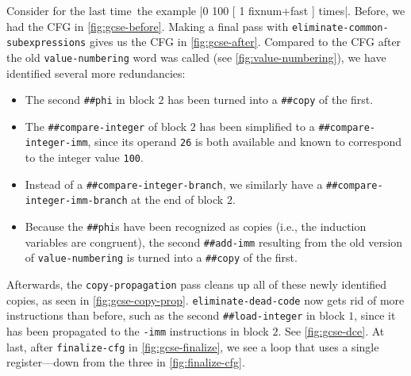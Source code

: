 
Consider for the last time~the example
%
\factor|0 100 [ 1 fixnum+fast ] times|.
%
Before, we had the \gls{CFG} in \vref{fig:gcse-before}.  Making a final pass
with \Verb|eliminate-common-subexpressions| gives us the \gls{CFG} in
\vref{fig:gcse-after}.  Compared to the \gls{CFG} after the old
\Verb|value-numbering| word was called (see \vref{fig:value-numbering}), we
have identified several more redundancies:
\begin{itemize}
  \item The second \Verb|##phi| in block $2$ has been turned into a
  \Verb|##copy| of the first.
%
  \item The \Verb|##compare-integer| of block $2$ has been simplified to
  a \Verb|##compare-integer-imm|, since its operand \Verb|26| is both
  available and known to correspond to the integer value \Verb|100|.
%
  \item Instead of a \Verb|##compare-integer-branch|, we similarly have a
  \Verb|##compare-integer-imm-branch| at the end of block $2$.
%
  \item Because the \Verb|##phi|s have been recognized as copies (i.e., the
  induction variables are congruent), the second \Verb|##add-imm| resulting
  from the old version of \Verb|value-numbering| is turned into a
  \Verb|##copy| of the first.
\end{itemize}


Afterwards, the \Verb|copy-propagation| pass cleans up all of these newly
identified copies, as seen in \vref{fig:gcse-copy-prop}.
\Verb|eliminate-dead-code| now gets rid of more instructions than before,
such as the second \Verb|##load-integer| in block $1$, since it has been
propagated to the \Verb|-imm| instructions in block $2$.  See
\vref{fig:gcse-dce}.  At last, after \Verb|finalize-cfg| in
\vref{fig:gcse-finalize}, we see a loop that uses a single register---down from
the three in \vref{fig:finalize-cfg}.
